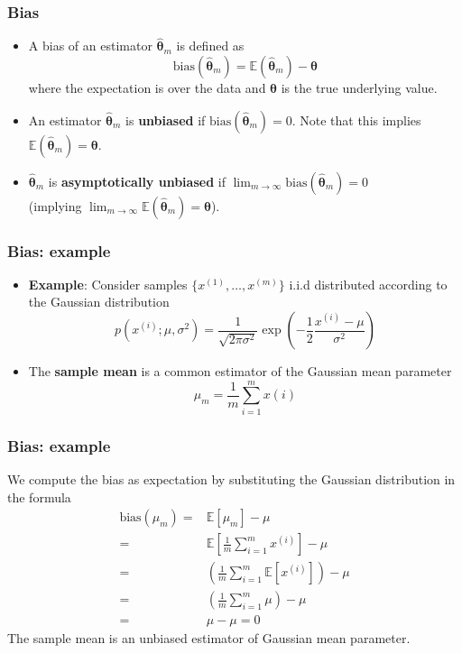\documentclass[notes]{beamer}          %
\newcommand{\vect}[1]{\bm{#1}}
\newcommand{\field}[1]{\mathbb{#1}}
\begin{document}
\begin{frame}
\frametitle{Bias}
    \begin{itemize}
        \item A bias of an estimator $\vect{\hat{\theta}}_m$ is defined as
        $$
        \mbox{bias}(\vect{\hat{\theta}}_m) = \field{E}(\vect{\hat{\theta}}_m) - \vect{\theta}
        $$
        where the expectation is over the data and $\vect{\theta}$ is the true underlying value.
        \item An estimator $\vect{\hat{\theta}}_m$ is {\bf unbiased} if $\mbox{bias}(\vect{\hat{\theta}}_m) = 0$. Note that this implies $\field{E}(\vect{\hat{\theta}}_m) = \vect{\theta}$.
        \item $\vect{\hat{\theta}}_m$ is {\bf asymptotically unbiased} if $\lim_{m \rightarrow \infty} \mbox{bias}(\vect{\hat{\theta}}_m) = 0$ \\
        (implying $\lim_{m \rightarrow \infty} \field{E}(\vect{\hat{\theta}}_m) = \vect{\theta}$).
    \end{itemize}
\end{frame}


\begin{frame}
\frametitle{Bias: example}
    \begin{itemize}
        \item {\bf Example}: Consider samples $\{x^{(1)}, \ldots, x^{(m)}\}$ i.i.d distributed according to the Gaussian distribution
        $$
        p(x^{(i)};\mu, \sigma^2) = \frac{1}{\sqrt{2 \pi \sigma^2}} \exp \left ( -\frac{1}{2} \frac{x^{(i)} - \mu}{\sigma^2} \right )
        $$
        \item The {\bf sample mean} is a common estimator of the Gaussian mean parameter
        $$
        \hat{\mu}_m = \frac{1}{m} \sum_{i=1}^{m}x{(i)}
        $$
    \end{itemize}
\end{frame}


\begin{frame}
\frametitle{Bias: example}
    We compute the bias as expectation by substituting the Gaussian distribution in the formula
    \begin{eqnarray*}
    \mbox{bias}(\mu_m) =  & \field{E}[\mu_m] - \mu  \\
     = & \field{E} \left [   \frac{1}{m} \sum_{i=1}^{m }x^{(i)} \right ] - \mu \\
     = & \left (   \frac{1}{m} \sum_{i=1}^{m} \field{E}[x^{(i)}] \right ) - \mu \\
     = & \left (   \frac{1}{m} \sum_{i=1}^{m} \mu \right ) - \mu \\
     = & \mu - \mu = 0
    \end{eqnarray*}
    The sample mean is an unbiased estimator of Gaussian mean parameter.
\end{frame}
\end{document}
